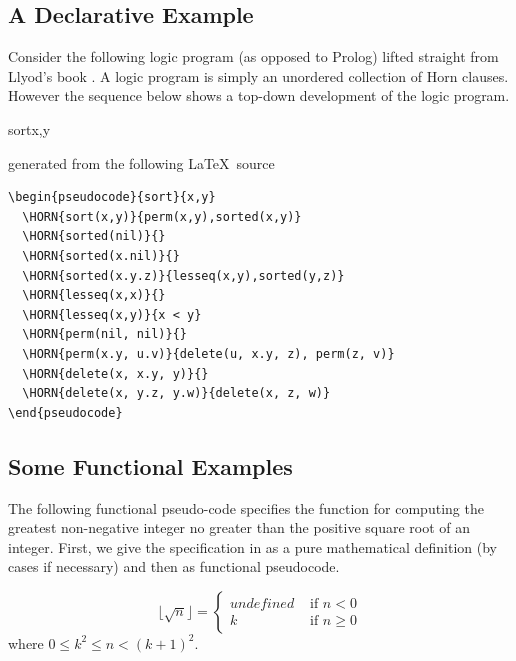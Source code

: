 \documentclass[a4]{article}
\begin{document}
\subsection{A Declarative Example}
Consider the following logic program (as opposed to Prolog) lifted
straight from Llyod's book \cite{lloyd}. A logic program is simply an
unordered collection of Horn clauses. However the sequence below shows
a top-down development of the logic program.

\begin{pseudocode}{sort}{x,y}
  \CASES
  \ENDCASES
\end{pseudocode}

\noindent{}generated from the following \LaTeX\ source 

\begin{verbatim}
\begin{pseudocode}{sort}{x,y}
  \HORN{sort(x,y)}{perm(x,y),sorted(x,y)}
  \HORN{sorted(nil)}{}
  \HORN{sorted(x.nil)}{}
  \HORN{sorted(x.y.z)}{lesseq(x,y),sorted(y,z)}
  \HORN{lesseq(x,x)}{}
  \HORN{lesseq(x,y)}{x < y}
  \HORN{perm(nil, nil)}{}
  \HORN{perm(x.y, u.v)}{delete(u, x.y, z), perm(z, v)}
  \HORN{delete(x, x.y, y)}{}
  \HORN{delete(x, y.z, y.w)}{delete(x, z, w)}
\end{pseudocode}
\end{verbatim}

\subsection{Some Functional Examples}

The following functional pseudo-code specifies the function for computing the
greatest non-negative integer no greater than the positive square root of an
integer. First, we give the specification in as a pure mathematical definition
(by cases if necessary) and then as functional pseudocode.  

\[
\lfloor \sqrt {n} \rfloor = 
\left\{
  \begin{array}{ll}
    undefined &\mbox{\ if\ } n < 0 \\
    k & \mbox{\ if\ } n \geq 0
  \end{array}
\right.
\]
where $0\leq k^2 \leq n < (k+1)^2$.
\end{document}
